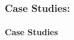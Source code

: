 \documentclass{tron}
\begin{document}
\subsubsection{Case Studies:}


\clearpage
\paragraph{Case Studies}


\newpage
\printglossaries



\clearpage
\appendix
\begin{appendices}
\end{appendices}
\end{document}
